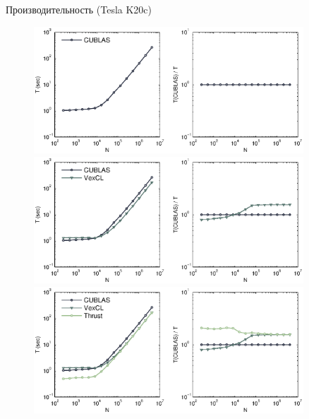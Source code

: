 \documentclass[@BEAMER_OPTIONS@]{beamer}
\begin{document}
\begin{frame}[fragile]{Производительность (Tesla K20c)}
    \begin{figure}
         {\includegraphics[width=0.9\textwidth]{perfcmp-1}}%
         {\includegraphics[width=0.9\textwidth]{perfcmp-2}}%
         {\includegraphics[width=0.9\textwidth]{perfcmp-3}}%

\end{figure}
\end{frame}
\end{document}
